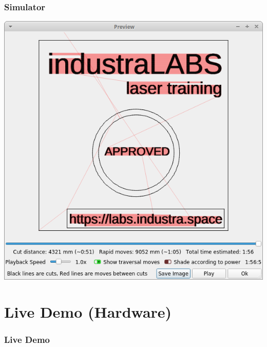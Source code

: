 \documentclass[14pt]{beamer}
\begin{document}
\begin{frame}
\frametitle{Simulator}
\centering
\includegraphics[scale=0.35]{imgs/lb_simulator.png}

\end{frame}






\section{Live Demo (Hardware)}
\begin{frame}
\frametitle{Live Demo}
\centering
\scalebox{13}{$\leftarrow$}


\end{frame}
\end{document}
